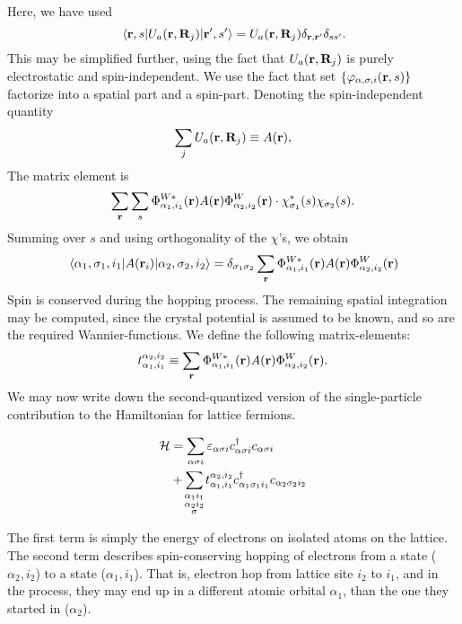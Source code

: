 Here, we have used
\begin{equation}
	\mel{\vb{r},s}{U_a(\vb{r},\vb{R}_j)}{\vb{r}',s'}= U_a(\vb{r},\vb{R}_j)\delta_{\vb{r},\vb{r}'}\delta_{ss'}.
\end{equation}
This may be simplified further, using the fact that $U_a(\vb{r},\vb{R}_j)$ is purely electrostatic and spin-independent.
We use the fact that set $\{\varphi_{\alpha, \sigma,i}(\vb{r},s)\}$ factorize into a spatial part and a spin-part.
Denoting the spin-independent quantity
\begin{equation}
	\sum_j U_a(\vb{r},\vb{R}_j) \equiv A(\vb{r}),
\end{equation}
The matrix element is
\begin{equation}
	\sum_{\vb{r}}\sum_s \Phi_{\alpha_1, i_1}^{W*} (\vb{r}) A(\vb{r})\Phi_{\alpha_2, i_2}^W(\vb r) \cdot \chi_{\sigma_1}^* (s)\chi_{\sigma_2} (s).
\end{equation}
Summing over $s$ and using orthogonality of the $\chi$'s, we obtain
\begin{equation}
	\mel{\alpha_1,\sigma_1,i_1}{A(\vb{r}_i)}{\alpha_2,\sigma_2,i_2} = \delta_{\sigma_1\sigma_2}\sum_{\vb r}\Phi_{\alpha_1, i_1}^{W*}(\vb r)A(\vb r)\Phi_{\alpha_2, i_2}^{W}(\vb r)
\end{equation}
Spin is conserved during the hopping process.
The remaining spatial integration may be computed, since the crystal potential is assumed to be known, and so are the required Wannier-functions.
We define the following matrix-elements:
\begin{equation}
	t_{\alpha_1,i_1}^{\alpha_2,i_2} \equiv \sum_{\vb r}\Phi_{\alpha_1, i_1}^{W*}(\vb r)A(\vb r)\Phi_{\alpha_2, i_2}^{W}(\vb r).
\end{equation}
We may now write down the second-quantized version of the single-particle contribution to the Hamiltonian for lattice fermions.
\begin{tcolorbox}
	\begin{align*}
		\Ha &= \sum_{\alpha\sigma i} \ep_{\alpha\sigma i}\cd_{\alpha\sigma i}c_{\alpha\sigma i} \\
		&+ \sum_{\mathclap{\substack{\alpha_1 i_1 \\ \alpha_2 i_2 \\ \sigma}}} t_{\alpha_1,i_1}^{\alpha_2,i_2}\cd_{\alpha_1\sigma_1 i_1}c_{\alpha_2\sigma_2 i_2}
	\end{align*}
\end{tcolorbox}
The first term is simply the energy of electrons on isolated atoms on the lattice. The second term describes spin-conserving hopping of electrons from a state ($\alpha_2, i_2$) to a state ($\alpha_1, i_1$). That is, electron hop from lattice site $i_2$ to $i_1$, and in the process, they may end up in a different atomic orbital $\alpha_1$, than the one they started in ($\alpha_2$).

